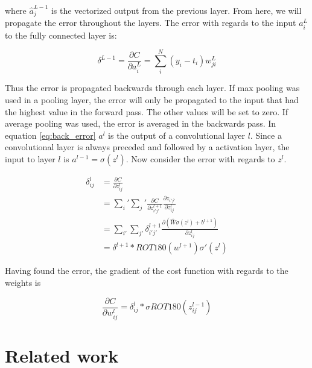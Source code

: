 \documentclass[thesis.tex]{subfiles}
\begin{document}
where $\hat{a}_{j}^{L-1}$ is the vectorized output from the previous layer. From here, we will propagate the error throughout the layers. The error with regards to the input $a_i^L$ to the fully connected layer is:

\begin{equation} %
  \delta^{L-1} = \frac{\partial C}{\partial a_i^L} = \sum_i^N (y_i - t_i)w_{ji}^{L}
  \label{eq:back_error}
\end{equation}

Thus the error is propagated backwards through each layer. If max pooling was used in a pooling layer, the error will only be propagated to the input that had the highest value in the forward pass. The other values will be set to zero. If average pooling was used, the error is averaged in the backwards pass.
In equation \ref{eq:back_error} $a^l$ is the output of a convolutional layer $l$. Since a convolutional layer is always preceded and followed by a activation layer, the input to layer $l$ is $a^{l-1} = \sigma(z^l)$. Now consider the error with regards to $z^l$.

\begin{equation}
  \begin{aligned}
  \delta_{ij}^l &= \frac{\partial C}{\partial z_{ij}^l} \\
  &= \sum_i' \sum_j' \frac{\partial C}{\partial z_{i'j'}^{l+1}}\frac{\partial z_{i'j'}}{\partial z_{ij}^l} \\
  &= \sum_{i'} \sum_{j'}\delta_{i'j'}^{l+1} \frac{\partial (\hat{W}\sigma(z^l) + b^{l+1})}{\partial z_{ij}^l} \\
  &= \delta^{l+1} * ROT180(w^{l+1})\sigma'(z^l)
  \end{aligned}
\end{equation}

Having found the error, the gradient of the cost function with regards to the weights is

\begin{equation} %
  \frac{\partial C}{\partial w_{ij}^l} = \delta_{ij}^l * \sigma{ROT180(z_{ij}^{l-1})}
\end{equation}




\section{Related work} \label{relatedwork}
\end{document}

